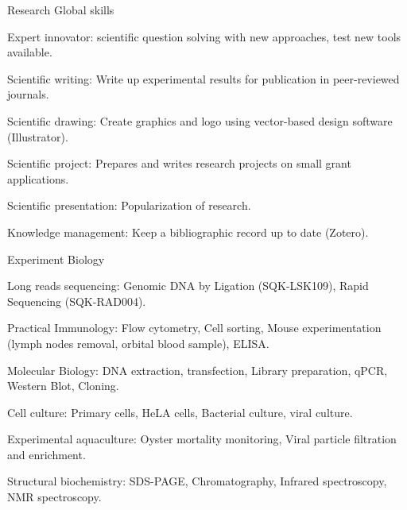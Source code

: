 

\begin{cventries}

  \cventry
    {Research} %
    {Global skills} %
    {} %
    {} %
    {
      \begin{cvitems} %
        \item {Expert innovator: scientific question solving with new approaches, test new tools available.}
        \item {Scientific writing: Write up experimental results for publication in peer-reviewed journals.}
        \item {Scientific drawing: Create graphics and logo using vector-based design software (Illustrator).}
        \item {Scientific project: Prepares and writes research projects on small grant applications.}
        \item {Scientific presentation: Popularization of research.}
        \item {Knowledge management: Keep a bibliographic record up to date (Zotero).}
      \end{cvitems}
    }


  \cventry
    {Experiment} %
    {Biology} %
    {} %
    {} %
    {
      \begin{cvitems} %
        \item {Long reads sequencing: Genomic DNA by Ligation (SQK-LSK109), Rapid Sequencing (SQK-RAD004).}
        \item {Practical Immunology: Flow cytometry, Cell sorting, Mouse experimentation (lymph nodes removal, orbital blood sample), ELISA.}
        \item {Molecular Biology: DNA extraction, transfection, Library preparation, qPCR, Western Blot, Cloning.}
        \item {Cell culture: Primary cells, HeLA cells, Bacterial culture, viral culture.}
        \item {Experimental aquaculture: Oyster mortality monitoring, Viral particle filtration and enrichment.}
        \item {Structural biochemistry: SDS-PAGE, Chromatography, Infrared spectroscopy, NMR spectroscopy.}
      \end{cvitems}
    }


\end{cventries}
